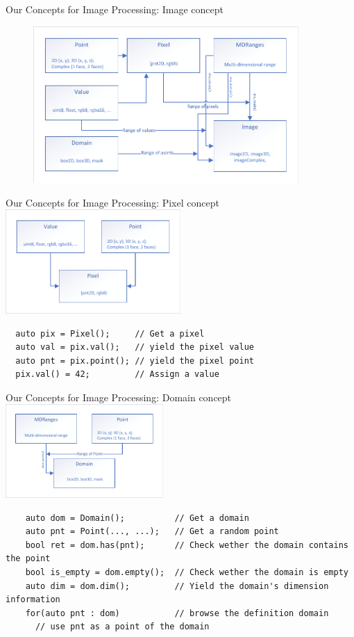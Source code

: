 \documentclass[12pt,aspectratio=169]{beamer}
\begin{document}
\begin{frame}[fragile]{Our Concepts for Image Processing: Image concept}
  \centering
  \begin{figure}
    \includegraphics[width=0.9\textwidth]{../figures/concepts/image}
  \end{figure}
\end{frame}

\begin{frame}[fragile]{Our Concepts for Image Processing: Pixel concept}
  \centering
  \includegraphics[width=0.5\textwidth]{../figures/concepts/pixel}
  \begin{verbatim}
  auto pix = Pixel();     // Get a pixel
  auto val = pix.val();   // yield the pixel value
  auto pnt = pix.point(); // yield the pixel point
  pix.val() = 42;         // Assign a value
  \end{verbatim}
\end{frame}

\begin{frame}[fragile]{Our Concepts for Image Processing: Domain concept}
  \centering
  \includegraphics[width=0.45\textwidth]{../figures/concepts/domain}
  \begin{verbatim}
    auto dom = Domain();          // Get a domain
    auto pnt = Point(..., ...);   // Get a random point
    bool ret = dom.has(pnt);      // Check wether the domain contains the point
    bool is_empty = dom.empty();  // Check wether the domain is empty
    auto dim = dom.dim();         // Yield the domain's dimension information
    for(auto pnt : dom)           // browse the definition domain
      // use pnt as a point of the domain
  \end{verbatim}
\end{frame}
\end{document}
